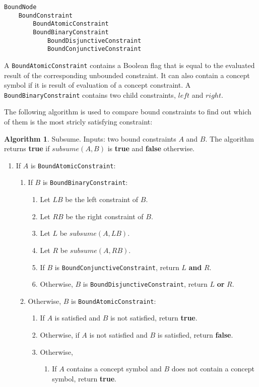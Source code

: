 \documentclass[a4paper,oneside,11pt]{book}
\theoremstyle{definition}
\newtheorem{algo}{Algorithm}[section]
\begin{document}
\begin{verbatim}
BoundNode
    BoundConstraint
        BoundAtomicConstraint
        BoundBinaryConstraint
            BoundDisjunctiveConstraint
            BoundConjunctiveConstraint
\end{verbatim}

A \verb|BoundAtomicConstraint| contains a Boolean flag that is equal to the evaluated result of the corresponding unbounded constraint.
It can also contain a concept symbol if it is result of evaluation of a concept constraint.
A \verb|BoundBinaryConstraint| contains two child constraints, $left$ and $right$.

The following algorithm is used to compare bound constraints to find out which of them is the most stricly satisfying constraint:

\begin{algo}\label{subsume} Subsume. Inputs: two bound constraints $A$ and $B$.
The algorithm returns \textbf{true} if $subsume(A, B)$ is \textbf{true} and \textbf{false} otherwise.
\begin{enumerate}
\item
If $A$ is \verb|BoundAtomicConstraint|:
\begin{enumerate}
\item
If $B$ is \verb|BoundBinaryConstraint|:
\begin{enumerate}
\item
Let $LB$ be the left constraint of $B$.
\item
Let $RB$ be the right constraint of $B$.
\item
Let $L$ be $subsume(A, LB)$.
\item
Let $R$ be $subsume(A, RB)$.
\item
If $B$ is \verb|BoundConjunctiveConstraint|, return $L$ \textbf{and} $R$.
\item
Otherwise, $B$ is \verb|BoundDisjunctiveConstraint|, return $L$ \textbf{or} $R$.
\end{enumerate}
\item
Otherwise, $B$ is \verb|BoundAtomicConstraint|:
\begin{enumerate}
\item
If $A$ is satisfied and $B$ is not satisfied, return \textbf{true}.
\item
Otherwise, if $A$ is not satisfied and $B$ is satisfied, return \textbf{false}.
\item
Otherwise,
\begin{enumerate}
\item
If $A$ contains a concept symbol and $B$ does not contain a concept symbol, return \textbf{true}.

\end{enumerate}
\end{enumerate}
\end{enumerate}
\end{enumerate}
\end{algo}
\end{document}
